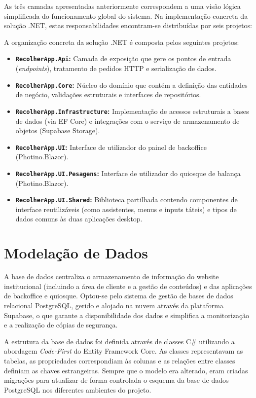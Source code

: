As três camadas apresentadas anteriormente correspondem a uma visão lógica simplificada do funcionamento global do sistema. Na implementação concreta da solução .NET, estas responsabilidades encontram-se distribuídas por seis projetos:

A organização concreta da solução .NET é composta pelos seguintes projetos:
\begin{itemize}
    \item \textbf{\texttt{RecolherApp.Api}:} Camada de exposição que gere os pontos de entrada (\textit{endpoints}), tratamento de pedidos \ac{HTTP} e serialização de dados.
    \item \textbf{\texttt{RecolherApp.Core}:} Núcleo do domínio que contém a definição das entidades de negócio, validações estruturais e interfaces de repositórios.
    \item \textbf{\texttt{RecolherApp.Infrastructure}:} Implementação de acessos estruturais a bases de dados (via EF Core) e integrações com o serviço de armazenamento de objetos (Supabase Storage).
    \item \textbf{\texttt{RecolherApp.UI}:} Interface de utilizador do painel de backoffice (Photino.Blazor).
    \item \textbf{\texttt{RecolherApp.UI.Pesagens}:} Interface de utilizador do quiosque de balança (Photino.Blazor).
    \item \textbf{\texttt{RecolherApp.UI.Shared}:} Biblioteca partilhada contendo componentes de interface reutilizáveis (como assistentes, menus e inputs táteis) e tipos de dados comuns às duas aplicações desktop.
\end{itemize}

\section{Modelação de Dados}\label{sec:modelacao-dados}

A base de dados centraliza o armazenamento de informação do website institucional (incluindo a área de cliente e a gestão de conteúdos) e das aplicações de backoffice e quiosque. Optou-se pelo sistema de gestão de bases de dados relacional PostgreSQL, gerido e alojado na nuvem através da plataforma Supabase, o que garante a disponibilidade dos dados e simplifica a monitorização e a realização de cópias de segurança.

A estrutura da base de dados foi definida através de classes C\# utilizando a abordagem \textit{Code-First} do Entity Framework Core. As classes representavam as tabelas, as propriedades correspondiam às colunas e as relações entre classes definiam as chaves estrangeiras. Sempre que o modelo era alterado, eram criadas migrações para atualizar de forma controlada o esquema da base de dados PostgreSQL nos diferentes ambientes do projeto.


